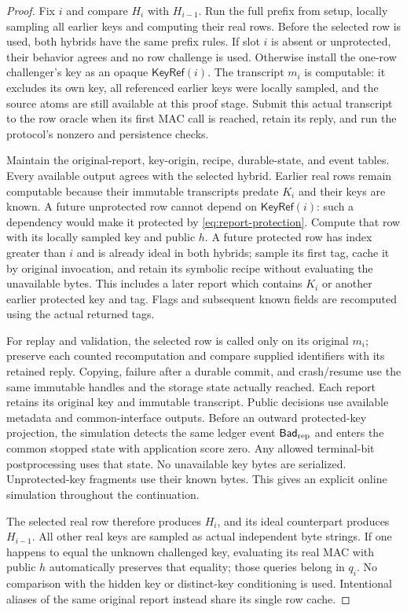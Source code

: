 \documentclass[pdflatex]{sn-jnl}
\theoremstyle{thmstyleone}
\theoremstyle{thmstylethree}
\theoremstyle{thmstyletwo}
\begin{document}
\begin{proof}
Fix $i$ and compare $H_i$ with $H_{i-1}$.  Run the full prefix from setup,
locally sampling all earlier keys and computing their real rows.  Before the
selected row is used, both hybrids have the same prefix rules.  If slot $i$
is absent or unprotected, their behavior agrees and no row challenge is used.
Otherwise install the one-row challenger's key as an opaque
$\mathsf{KeyRef}(i)$.  The transcript $m_i$ is computable: it excludes its own
key, all referenced earlier keys were locally sampled, and the source atoms
are still available at this proof stage.  Submit this actual transcript to
the row oracle when its first MAC call is reached, retain its reply, and run
the protocol's nonzero and persistence checks.

Maintain the original-report, key-origin, recipe, durable-state, and event
tables.  Every available output agrees with the selected hybrid.  Earlier
real rows remain computable because their immutable transcripts predate
$K_i$ and their keys are known.  A future unprotected row cannot depend on
$\mathsf{KeyRef}(i)$: such a dependency would make it protected by
\eqref{eq:report-protection}.  Compute that row with its locally sampled key
and public $h$.  A future protected row has index greater than $i$ and is
already ideal in both hybrids; sample its first tag, cache it by original
invocation, and retain its symbolic recipe without evaluating the unavailable
bytes.  This includes a later report which contains $K_i$ or another earlier
protected key and tag.  Flags and subsequent known fields are recomputed
using the actual returned tags.

For replay and validation, the selected row is called only on its original
$m_i$; preserve each counted recomputation and compare supplied identifiers
with its retained reply.  Copying, failure after a durable commit, and
crash/resume use the same immutable handles and the storage state actually
reached. Each report retains its original key and immutable transcript.
Public decisions use available metadata and common-interface outputs.
Before an outward protected-key projection, the simulation detects the same
ledger event $\mathsf{Bad}_{\rm rep}$ and enters the common stopped state
with application score zero. Any allowed terminal-bit postprocessing uses
that state. No unavailable key bytes are serialized. Unprotected-key
fragments use their known bytes.
This gives an explicit online simulation throughout the continuation.

The selected real row therefore produces $H_i$, and its ideal counterpart
produces $H_{i-1}$.  All other real keys are sampled as actual independent byte
strings.  If one happens to equal the unknown challenged key, evaluating its
real MAC with public $h$ automatically preserves that equality; those queries
belong in $q_i$.  No comparison with the hidden key or distinct-key conditioning
is used.  Intentional aliases of the same original report instead share its
single row cache.


\end{proof}
\end{document}
